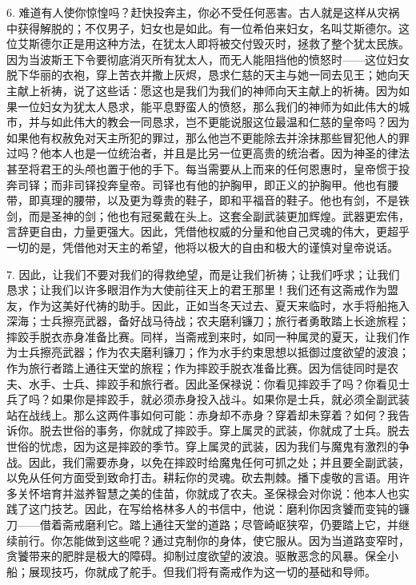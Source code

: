 6. 难道有人使你惊惶吗？赶快投奔主，你必不受任何恶害。古人就是这样从灾祸中获得解脱的；不仅男子，妇女也是如此。有一位希伯来妇女，名叫艾斯德尔。这位艾斯德尔正是用这种方法，在犹太人即将被交付毁灭时，拯救了整个犹太民族。因为当波斯王下令要彻底消灭所有犹太人，而无人能阻挡他的愤怒时——这位妇女脱下华丽的衣袍，穿上苦衣并撒上灰烬，恳求仁慈的天主与她一同去见王；她向天主献上祈祷，说了这些话：愿这也是我们为我们的神师向天主献上的祈祷。因为如果一位妇女为犹太人恳求，能平息野蛮人的愤怒，那么我们的神师为如此伟大的城市，并与如此伟大的教会一同恳求，岂不更能说服这位最温和仁慈的皇帝吗？因为如果他有权赦免对天主所犯的罪过，那么他岂不更能除去并涂抹那些冒犯他人的罪过吗？他本人也是一位统治者，并且是比另一位更高贵的统治者。因为神圣的律法甚至将君王的头颅也置于他的手下。每当需要从上而来的任何恩惠时，皇帝惯于投奔司铎；而非司铎投奔皇帝。司铎也有他的护胸甲，即正义的护胸甲。他也有腰带，即真理的腰带，以及更为尊贵的鞋子，即和平福音的鞋子。他也有剑，不是铁剑，而是圣神的剑；他也有冠冕戴在头上。这套全副武装更加辉煌。武器更宏伟，言辞更自由，力量更强大。因此，凭借他权威的分量和他自己灵魂的伟大，更超乎一切的是，凭借他对天主的希望，他将以极大的自由和极大的谨慎对皇帝说话。\par

7. 因此，让我们不要对我们的得救绝望，而是让我们祈祷；让我们呼求；让我们恳求；让我们以许多眼泪作为大使前往天上的君王那里！我们还有这斋戒作为盟友，作为这美好代祷的助手。因此，正如当冬天过去、夏天来临时，水手将船拖入深海；士兵擦亮武器，备好战马待战；农夫磨利镰刀；旅行者勇敢踏上长途旅程；摔跤手脱衣赤身准备比赛。同样，当斋戒到来时，如同一种属灵的夏天，让我们作为士兵擦亮武器；作为农夫磨利镰刀；作为水手约束思想以抵御过度欲望的波浪；作为旅行者踏上通往天堂的旅程；作为摔跤手脱衣准备比赛。因为信徒同时是农夫、水手、士兵、摔跤手和旅行者。因此圣保禄说：你看见摔跤手了吗？你看见士兵了吗？如果你是摔跤手，就必须赤身投入战斗。如果你是士兵，就必须全副武装站在战线上。那么这两件事如何可能：赤身却不赤身？穿着却未穿着？如何？我告诉你。脱去世俗的事务，你就成了摔跤手。穿上属灵的武装，你就成了士兵。脱去世俗的忧虑，因为这是摔跤的季节。穿上属灵的武装，因为我们与魔鬼有激烈的争战。因此，我们需要赤身，以免在摔跤时给魔鬼任何可抓之处；并且要全副武装，以免从任何方面受到致命打击。耕耘你的灵魂。砍去荆棘。播下虔敬的言语。用许多关怀培育并滋养智慧之美的佳苗，你就成了农夫。圣保禄会对你说：他本人也实践了这门技艺。因此，在写给格林多人的书信中，他说：磨利你因贪饕而变钝的镰刀——借着斋戒磨利它。踏上通往天堂的道路；尽管崎岖狭窄，仍要踏上它，并继续前行。你怎能做到这些呢？通过克制你的身体，使它服从。因为当道路变窄时，贪饕带来的肥胖是极大的障碍。抑制过度欲望的波浪。驱散恶念的风暴。保全小船；展现技巧，你就成了舵手。但我们将有斋戒作为这一切的基础和导师。\par

